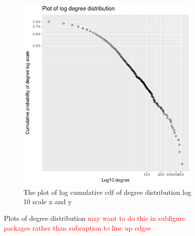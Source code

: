 \begin{figure}
\begin{subfigure}[t]{0.45\textwidth}
    \end{subfigure}
    \hfill
    \begin{subfigure}[t]{0.45\textwidth}
        \centering
        \includegraphics[width=\linewidth]{images/plot_log_degree_distribution.png} 
        \caption{The plot of log cumulative cdf of degree distribution log 10 scale x and y} \label{fig:log_degree_distribution}
    \end{subfigure}
    \caption{Plots of degree distribution \textcolor{red}{may want to do this in subfigure packages rather than subcaption to line up edges}}
\end{figure}

